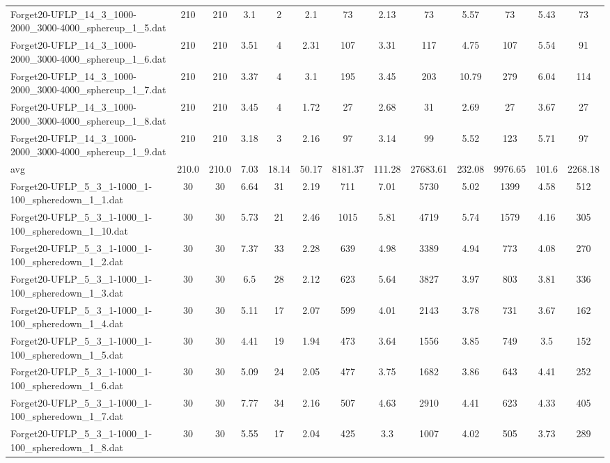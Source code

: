 \begin{table}[!ht]
{\begin{tabular}{lcccccccccccc}
Forget20-UFLP\_14\_3\_1000-2000\_3000-4000\_sphereup\_1\_5.dat & 210 & 210 & 3.1 & 2 & 2.1 & 73 & 2.13 & 73 & 5.57 & 73 & 5.43 & 73 \\
Forget20-UFLP\_14\_3\_1000-2000\_3000-4000\_sphereup\_1\_6.dat & 210 & 210 & 3.51 & 4 & 2.31 & 107 & 3.31 & 117 & 4.75 & 107 & 5.54 & 91 \\
Forget20-UFLP\_14\_3\_1000-2000\_3000-4000\_sphereup\_1\_7.dat & 210 & 210 & 3.37 & 4 & 3.1 & 195 & 3.45 & 203 & 10.79 & 279 & 6.04 & 114 \\
Forget20-UFLP\_14\_3\_1000-2000\_3000-4000\_sphereup\_1\_8.dat & 210 & 210 & 3.45 & 4 & 1.72 & 27 & 2.68 & 31 & 2.69 & 27 & 3.67 & 27 \\
Forget20-UFLP\_14\_3\_1000-2000\_3000-4000\_sphereup\_1\_9.dat & 210 & 210 & 3.18 & 3 & 2.16 & 97 & 3.14 & 99 & 5.52 & 123 & 5.71 & 97 \\
\hline avg & 210.0 & 210.0 & 7.03& 18.14 & 50.17& 8181.37 & 111.28& 27683.61 & 232.08& 9976.65 & 101.6& 2268.18\\ \hline
Forget20-UFLP\_5\_3\_1-1000\_1-100\_spheredown\_1\_1.dat & 30 & 30 & 6.64 & 31 & 2.19 & 711 & 7.01 & 5730 & 5.02 & 1399 & 4.58 & 512 \\
Forget20-UFLP\_5\_3\_1-1000\_1-100\_spheredown\_1\_10.dat & 30 & 30 & 5.73 & 21 & 2.46 & 1015 & 5.81 & 4719 & 5.74 & 1579 & 4.16 & 305 \\
Forget20-UFLP\_5\_3\_1-1000\_1-100\_spheredown\_1\_2.dat & 30 & 30 & 7.37 & 33 & 2.28 & 639 & 4.98 & 3389 & 4.94 & 773 & 4.08 & 270 \\
Forget20-UFLP\_5\_3\_1-1000\_1-100\_spheredown\_1\_3.dat & 30 & 30 & 6.5 & 28 & 2.12 & 623 & 5.64 & 3827 & 3.97 & 803 & 3.81 & 336 \\
Forget20-UFLP\_5\_3\_1-1000\_1-100\_spheredown\_1\_4.dat & 30 & 30 & 5.11 & 17 & 2.07 & 599 & 4.01 & 2143 & 3.78 & 731 & 3.67 & 162 \\
Forget20-UFLP\_5\_3\_1-1000\_1-100\_spheredown\_1\_5.dat & 30 & 30 & 4.41 & 19 & 1.94 & 473 & 3.64 & 1556 & 3.85 & 749 & 3.5 & 152 \\
Forget20-UFLP\_5\_3\_1-1000\_1-100\_spheredown\_1\_6.dat & 30 & 30 & 5.09 & 24 & 2.05 & 477 & 3.75 & 1682 & 3.86 & 643 & 4.41 & 252 \\
Forget20-UFLP\_5\_3\_1-1000\_1-100\_spheredown\_1\_7.dat & 30 & 30 & 7.77 & 34 & 2.16 & 507 & 4.63 & 2910 & 4.41 & 623 & 4.33 & 405 \\
Forget20-UFLP\_5\_3\_1-1000\_1-100\_spheredown\_1\_8.dat & 30 & 30 & 5.55 & 17 & 2.04 & 425 & 3.3 & 1007 & 4.02 & 505 & 3.73 & 289 \\

\end{tabular}}
\end{table}
